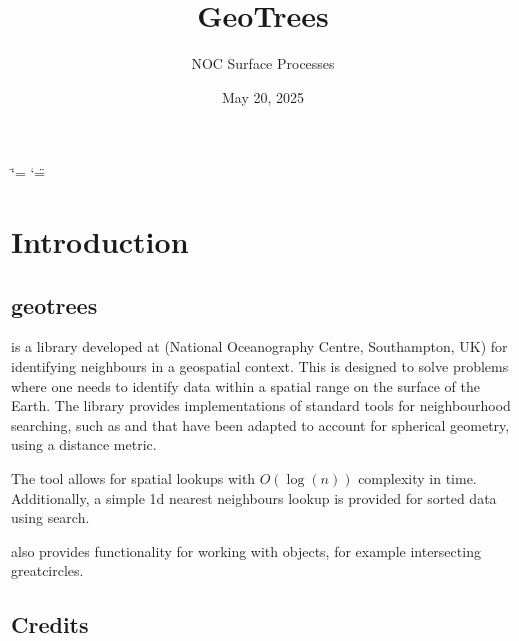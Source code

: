 \documentclass[letterpaper,10pt,english]{sphinxmanual}
\title{GeoTrees}
\date{May 20, 2025}
\author{NOC Surface Processes}
\begin{document}
\ifdefined\shorthandoff
  \ifnum\catcode`\=\string=\active\shorthandoff{=}\fi
  \ifnum\catcode`\"=\active{}\fi
\fi

\pagestyle{empty}
\sphinxmaketitle
\pagestyle{plain}
\sphinxtableofcontents
\pagestyle{normal}
\label{\detokenize{index::doc}}


\sphinxstepscope


\chapter{Introduction}
\label{\detokenize{introduction:introduction}}\label{\detokenize{introduction::doc}}

\section{geotrees}
\label{\detokenize{introduction:geotrees}}
\sphinxAtStartPar
{} is a  library developed at  (National Oceanography Centre, Southampton, UK) for
identifying neighbours in a geo\sphinxhyphen{}spatial context. This is designed to solve problems where one needs to identify
data within a spatial range on the surface of the Earth. The library provides implementations of standard tools
for neighbourhood searching, such as  and  that have been adapted to account for spherical
geometry, using a  distance metric.

\sphinxAtStartPar
The tool allows for spatial look\sphinxhyphen{}ups with \(O(\log(n))\) complexity in time. Additionally, a simple 1\sphinxhyphen{}d nearest
neighbours look\sphinxhyphen{}up is provided for sorted data using  search.

\sphinxAtStartPar
{} also provides functionality for working with  objects, for example intersecting
great\sphinxhyphen{}circles.


\section{Credits}
\label{\detokenize{introduction:credits}}
\end{document}
